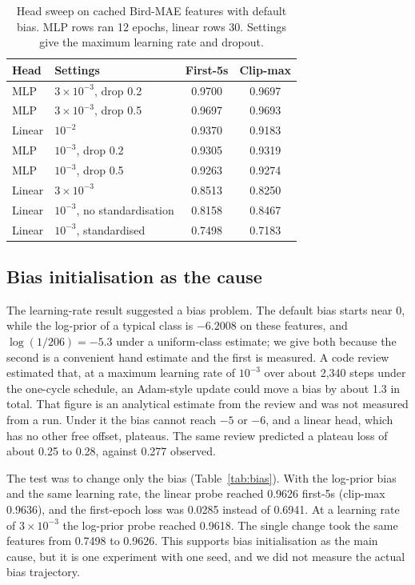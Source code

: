 \documentclass[letterpaper]{article} %
\begin{document}
\begin{table}[t]
\centering
\small
\begin{tabular}{llcc}
\toprule
Head & Settings & First-5s & Clip-max \\
\midrule
MLP & $3\times10^{-3}$, drop 0.2 & 0.9700 & 0.9697 \\
MLP & $3\times10^{-3}$, drop 0.5 & 0.9697 & 0.9693 \\
Linear & $10^{-2}$ & 0.9370 & 0.9183 \\
MLP & $10^{-3}$, drop 0.2 & 0.9305 & 0.9319 \\
MLP & $10^{-3}$, drop 0.5 & 0.9263 & 0.9274 \\
Linear & $3\times10^{-3}$ & 0.8513 & 0.8250 \\
Linear & $10^{-3}$, no standardisation & 0.8158 & 0.8467 \\
Linear & $10^{-3}$, standardised & 0.7498 & 0.7183 \\
\bottomrule
\end{tabular}
\caption{Head sweep on cached Bird-MAE features with default bias. MLP rows ran 12 epochs, linear rows 30. Settings give the maximum learning rate and dropout.}
\label{tab:sweep}
\end{table}

\subsection{Bias initialisation as the cause}
The learning-rate result suggested a bias problem. The default bias starts near 0, while the log-prior of a typical class is $-6.2008$ on these features, and $\log(1/206)=-5.3$ under a uniform-class estimate; we give both because the second is a convenient hand estimate and the first is measured. A code review estimated that, at a maximum learning rate of $10^{-3}$ over about 2,340 steps under the one-cycle schedule, an Adam-style update could move a bias by about 1.3 in total. That figure is an analytical estimate from the review and was not measured from a run. Under it the bias cannot reach $-5$ or $-6$, and a linear head, which has no other free offset, plateaus. The same review predicted a plateau loss of about 0.25 to 0.28, against 0.277 observed.

The test was to change only the bias (Table~\ref{tab:bias}). With the log-prior bias and the same learning rate, the linear probe reached 0.9626 first-5s (clip-max 0.9636), and the first-epoch loss was 0.0285 instead of 0.6941. At a learning rate of $3\times10^{-3}$ the log-prior probe reached 0.9618. The single change took the same features from 0.7498 to 0.9626. This supports bias initialisation as the main cause, but it is one experiment with one seed, and we did not measure the actual bias trajectory.
\end{document}
